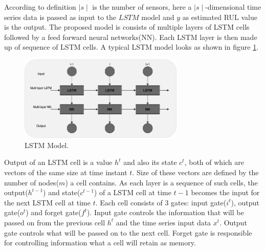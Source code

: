 According to definition $\mid s\mid$ is the number of sensors, here a $\mid s\mid$-dimensional time series data is passed as input to the $LSTM$ model and $y$ as estimated RUL value is the output. The proposed model is consists of multiple layers of LSTM cells followed by a feed forward neural networks(NN). Each LSTM layer is then made up of sequence of LSTM cells. A typical LSTM model looks as shown in figure \ref{fig:lstm_rul}.
\begin{figure}[ht]
    \centering
    \includegraphics[width=0.7\textwidth]{gfx/rul_lstm1}
    \caption{LSTM Model. \cite{DBLP:conf/icphm/ZhengRFG17} }
    \label{fig:lstm_rul}
\end{figure}

Output of an LSTM cell is a value $h^t$ and also its state $c^t$, both of which are vectors of the same size at time instant $t$. Size of these vectors are defined by the number of nodes($m$) a cell contains. As each layer is a sequence of such cells, the output($h^{t-1}$) and state($c^{t-1}$) of a LSTM cell at time $t-1$ becomes the input for the next LSTM cell at time $t$. Each cell consists of 3 gates: input gate($i^t$), output gate($o^t$) and forget gate($f^t$). Input gate controls the information that will be passed on from the previous cell $h^t$ and the time series input data $x^t$. Output gate controls what will be passed on to the next cell. Forget gate is responsible for controlling information what a cell will retain as memory.

